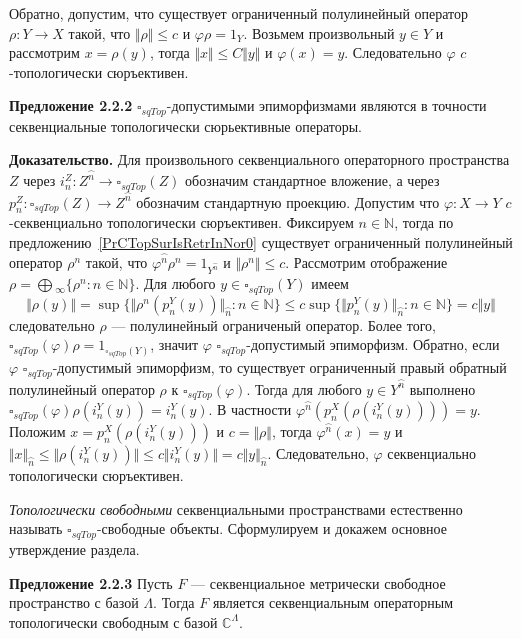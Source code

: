 \documentclass[12pt]{article}
\begin{document}
Обратно, допустим, что существует ограниченный полулинейный оператор $\rho:Y\to
X$ такой, что $\Vert\rho\Vert\leq c$ и $\varphi\rho=1_Y$. Возьмем произвольный
$y\in Y$ и рассмотрим $x=\rho(y)$, тогда $\Vert x\Vert\leq C\Vert y\Vert$ и
$\varphi(x)=y$. Следовательно $\varphi$ $c$-топологически сюръективен.

\medskip

{\bf Предложение 2.2.2} $\square_{sqTop}$-допустимыми эпиморфизмами являются в
точности секвенциальные топологически сюрьективные операторы.

{\bf Доказательство.} Для произвольного секвенциального операторного
пространства $Z$ через $i_n^Z:Z^{\wideparen{n}}\to\square_{sqTop}(Z)$ обозначим
стандартное вложение, а через $p_n^Z:\square_{sqTop}(Z)\to Z^{\wideparen{n}}$
обозначим стандартную проекцию. Допустим что $\varphi:X\to Y$ $c$-секвенциально
топологически сюръективен. Фиксируем $n\in\mathbb{N}$, тогда по 
предложению~\ref{PrCTopSurIsRetrInNor0} существует ограниченный 
полулинейный оператор
$\rho^n$ такой, что $\varphi^{\wideparen{n}}\rho^n=1_{Y^{\wideparen{n}}}$ и
$\Vert\rho^n\Vert\leq c$. Рассмотрим отображение $
\rho=\bigoplus{}_\infty \{\rho^n:n\in\mathbb{N} \}$. Для любого $y\in
\square_{sqTop}(Y)$ имеем 
$$
\Vert \rho(y)\Vert
=\sup \{\Vert\rho^n(p_n^Y(y))\Vert_{\wideparen{n}}: n\in\mathbb{N} \}\leq
c\sup \{\Vert p_n^Y(y)\Vert_{\wideparen{n}}: n\in\mathbb{N} \}=c\Vert y\Vert
$$
следовательно $\rho$ --- полулинейный ограниченый оператор. Более того,
$\square_{sqTop}(\varphi)\rho=1_{\square_{sqTop}(Y)}$, значит $\varphi$
$\square_{sqTop}$-допустимый эпиморфизм. Обратно, если $\varphi$
$\square_{sqTop}$-допустимый эпиморфизм, то существует ограниченный правый
обратный полулинейный оператор  $\rho$ к $\square_{sqTop}(\varphi)$. Тогда для
любого $y\in Y^{\wideparen{n}}$ выполнено
$\square_{sqTop}(\varphi)\rho(i_n^Y(y))=i_n^Y(y)$. В частности
$\varphi^{\wideparen{n}}(p_n^X(\rho(i_n^Y(y))))=y$. Положим
$x=p_n^X(\rho(i_n^Y(y)))$ и $c=\Vert\rho\Vert$, тогда
$\varphi^{\wideparen{n}}(x)=y$ и $\Vert
x\Vert_{\wideparen{n}}\leq\Vert\rho(i_n^Y(y))\Vert\leq c\Vert
i_n^Y(y)\Vert=c\Vert y\Vert_{\wideparen{n}}$. Следовательно, $\varphi$
секвенциально топологически сюръективен.


\medskip

\textit{Топологически свободными} секвенциальными пространствами естественно
называть $\square_{sqTop}$-свободные объекты. Сформулируем и докажем основное
утверждение раздела.

\medskip

{\bf Предложение 2.2.3} Пусть $F$ --- секвенциальное метрически свободное
пространство с базой $\Lambda$. Тогда $F$ является секвенциальным  операторным
топологически свободным с базой $\mathbb{C}^{\Lambda}$.
\end{document}
